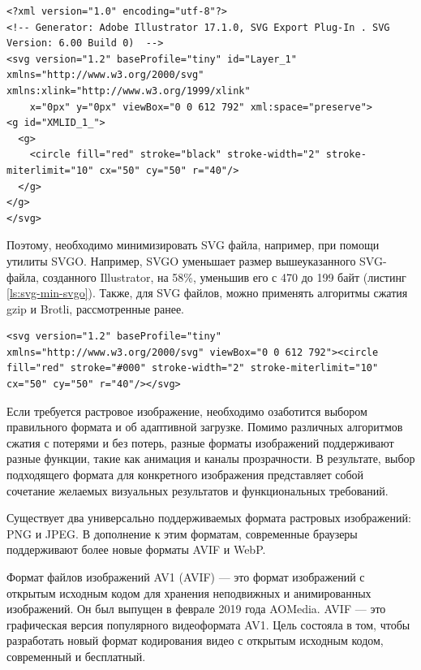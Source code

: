 \begin{lstlisting}[caption={SVG файл созданный в Adobe Illustrator}, label={ls:svg-illustrator}]
<?xml version="1.0" encoding="utf-8"?>
<!-- Generator: Adobe Illustrator 17.1.0, SVG Export Plug-In . SVG Version: 6.00 Build 0)  -->
<svg version="1.2" baseProfile="tiny" id="Layer_1" xmlns="http://www.w3.org/2000/svg" xmlns:xlink="http://www.w3.org/1999/xlink"
    x="0px" y="0px" viewBox="0 0 612 792" xml:space="preserve">
<g id="XMLID_1_">
  <g>
    <circle fill="red" stroke="black" stroke-width="2" stroke-miterlimit="10" cx="50" cy="50" r="40"/>
  </g>
</g>
</svg>
\end{lstlisting}

Поэтому, необходимо минимизировать SVG файла, например, при помощи утилиты SVGO. Например, SVGO уменьшает размер вышеуказанного SVG-файла, созданного Illustrator, на 58\%, уменьшив его с 470 до 199 байт (листинг \ref{ls:svg-min-svgo}). Также, для SVG файлов, можно применять алгоритмы сжатия gzip и Brotli, рассмотренные ранее.

\begin{lstlisting}[caption={SVG файл после минификации при помощи утилиты SVGO}, label={ls:svg-min-svgo}]
<svg version="1.2" baseProfile="tiny" xmlns="http://www.w3.org/2000/svg" viewBox="0 0 612 792"><circle fill="red" stroke="#000" stroke-width="2" stroke-miterlimit="10" cx="50" cy="50" r="40"/></svg>
\end{lstlisting}

Если требуется растровое изображение, необходимо озаботится выбором правильного формата и об адаптивной загрузке. Помимо различных алгоритмов сжатия с потерями и без потерь, разные форматы изображений поддерживают разные функции, такие как анимация и каналы прозрачности. В результате, выбор подходящего формата для конкретного изображения представляет собой сочетание желаемых визуальных результатов и функциональных требований.

Существует два универсально поддерживаемых формата растровых изображений: PNG и JPEG. В дополнение к этим форматам, современные браузеры поддерживают более новые форматы AVIF и WebP.

Формат файлов изображений AV1 (AVIF) — это формат изображений с открытым исходным кодом для хранения неподвижных и анимированных изображений. Он был выпущен в феврале 2019 года AOMedia. AVIF — это графическая версия популярного видеоформата AV1. Цель состояла в том, чтобы разработать новый формат кодирования видео с открытым исходным кодом, современный и бесплатный.

